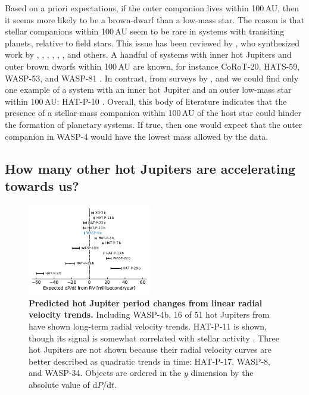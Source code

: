 \documentclass[12pt,twocolumn,tighten]{aastex62}
\begin{document}
Based on a priori expectations, if the outer companion lives within
100$\,$AU, then it seems more likely to be a brown-dwarf than a
low-mass star.  The reason is that stellar companions within 100$\,$AU
seem to be rare in systems with transiting planets, relative to field
stars.  This issue has been reviewed by \citet{moe_impact_2019}, who
synthesized work by \citet{wang_influence_2014,wang_influence_2015},
\citet{ngo_2015_fohj2}, \citet{ngo_friends_2016}, \citet{kraus_impact_2016},
\citet{matson_stellar_2018}, \citet{ziegler_soar_2020}, and others.
A handful of systems with inner hot Jupiters and outer brown dwarfs within
100$\,$AU are known, for instance CoRoT-20, HATS-59, WASP-53,
and WASP-81
\citep{triaud_peculiar_2017,rey_brown_2018,sarkis_hats-59bc_2018}.  In
contrast, from surveys by
\citet{knutson_friends_2014}, \citet{ngo_2015_fohj2} and
\citet{mugrauer_search_2019} we could find only one example of a
system with an inner hot Jupiter and an outer low-mass star within
100$\,$AU: HAT-P-10 \citep{bakos_2009_hatp10}.  Overall, this body of
literature indicates that the presence of a stellar-mass companion
within 100$\,$AU of the host star could hinder the formation of
planetary systems.  If true, then one would expect that the outer
companion in WASP-4 would have the lowest mass allowed by the data.


\subsection{How many other hot Jupiters are accelerating towards us?}

\begin{figure}[t]
	\begin{center}
		\leavevmode
		\includegraphics[width=0.48\textwidth]{f5.pdf}
	\end{center}
	\vspace{-0.4cm}
	\caption{
  {\bf Predicted hot Jupiter period changes from linear radial
  velocity trends.} Including WASP-4b, 16 of 51 hot Jupiters from
  \citet{knutson_friends_2014} have shown long-term radial velocity
  trends.  HAT-P-11 is shown, though its signal is somewhat correlated
  with stellar activity \citep{yee_hat-p-11_2018}.  Three hot Jupiters
  are not shown because their radial velocity curves are better
  described as quadratic trends in time: HAT-P-17, WASP-8, and
  WASP-34.  Objects are ordered in the $y$ dimension by the absolute
  value of d$P$/d$t$.
	\label{fig:pdot_pop}
  \vspace{-0.3cm}
	}
\end{figure}
\end{document}
